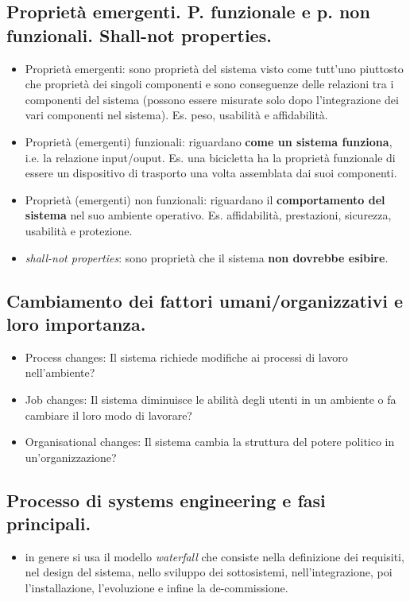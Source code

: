 \subsection{Proprietà emergenti. P. funzionale e p. non funzionali. Shall-not properties.}
\begin{itemize}
    \item Proprietà emergenti: sono proprietà del sistema visto come tutt'uno piuttosto che proprietà dei singoli componenti e sono conseguenze delle relazioni tra i componenti del sistema (possono essere misurate solo dopo l'integrazione dei vari componenti nel sistema). Es. peso, usabilità e affidabilità.
    \item Proprietà (emergenti) funzionali: riguardano \textbf{come un sistema funziona}, i.e. la relazione input/ouput. Es. una bicicletta ha la proprietà funzionale di essere un dispositivo di trasporto una volta assemblata dai suoi componenti.
    \item Proprietà (emergenti) non funzionali: riguardano il \textbf{comportamento del sistema} nel suo ambiente operativo. Es. affidabilità, prestazioni, sicurezza, usabilità e protezione.
    \item \textit{shall-not properties}: sono proprietà che il sistema \textbf{non dovrebbe esibire}.
\end{itemize}
\subsection{Cambiamento dei fattori umani/organizzativi e loro importanza.}
\begin{itemize}
    \item Process changes: Il sistema richiede modifiche ai processi di lavoro nell'ambiente?
    \item Job changes: Il sistema diminuisce le abilità degli utenti in un ambiente o fa cambiare il loro modo di lavorare?
    \item Organisational changes: Il sistema cambia la struttura del potere politico in un'organizzazione?
\end{itemize}
\subsection{Processo di systems engineering e fasi principali.}
\begin{itemize}
    \item in genere si usa il modello \textit{waterfall} che consiste nella definizione dei requisiti, nel design del sistema, nello sviluppo dei sottosistemi, nell'integrazione, poi l'installazione, l'evoluzione e infine la de-commissione.
\end{itemize}
